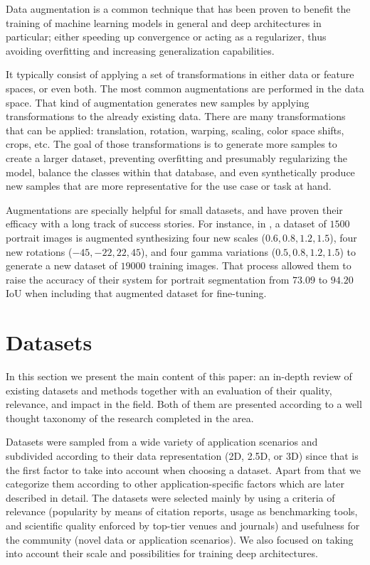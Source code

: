 Data augmentation is a common technique that has been proven to benefit the training of machine learning models in general and deep architectures in particular; either speeding up convergence or acting as a regularizer, thus avoiding overfitting and increasing generalization capabilities\cite{Wong2016}.

It typically consist of applying a set of transformations in either data or feature spaces, or even both. The most common augmentations are performed in the data space. That kind of augmentation generates new samples by applying transformations to the already existing data. There are many transformations that can be applied: translation, rotation, warping, scaling, color space shifts, crops, etc. The goal of those transformations is to generate more samples to create a larger dataset, preventing overfitting and presumably regularizing the model, balance the classes within that database, and even synthetically produce new samples that are more representative for the use case or task at hand.

Augmentations are specially helpful for small datasets, and have proven their efficacy with a long track of success stories. For instance, in \cite{Shen2016}, a dataset of $1500$ portrait images is augmented synthesizing four new scales ($0.6, 0.8, 1.2, 1.5$), four new rotations ($-45, -22, 22, 45$), and four gamma variations ($0.5, 0.8, 1.2, 1.5$) to generate a new dataset of $19000$ training images. That process allowed them to raise the accuracy of their system for portrait segmentation from $73.09$ to $94.20$ \ac{IoU} when including that augmented dataset for fine-tuning.

\section{Datasets}
\label{cha:semseg:sec:datasets}

In this section we present the main content of this paper: an in-depth review of existing datasets and methods together with an evaluation of their quality, relevance, and impact in the field. Both of them are presented according to a well thought taxonomy of the research completed in the area.

Datasets were sampled from a wide variety of application scenarios and subdivided according to their data representation (2D, 2.5D, or 3D) since that is the first factor to take into account when choosing a dataset. Apart from that we categorize them according to other application-specific factors which are later described in detail. The datasets were selected mainly by using a criteria of relevance (popularity by means of citation reports, usage as benchmarking tools, and scientific quality enforced by top-tier venues and journals) and usefulness for the community (novel data or application scenarios). We also focused on taking into account their scale and possibilities for training deep architectures.

